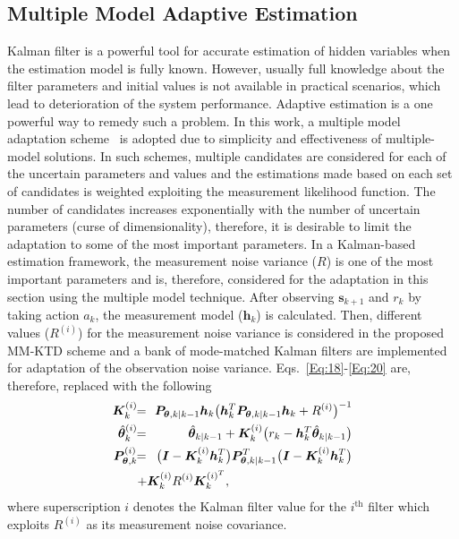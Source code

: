 \documentclass{ieeeaccess}
\def\k{_{k}}
\def\nk{_{k+1}}
\def\i{^{i}}
\def\bt{\bm{\theta}}
\def\h{\bm{h}}
\def\I{\bm{I}}
\def\K{\bm{K}}
\def\P{\bm{P}}
\def\s{\bm{s}}
\def\kpk{_{k|k-1}}
\def\i{^{(i)}}
\begin{document}
\subsection{Multiple Model Adaptive Estimation}
Kalman filter is a powerful tool for accurate estimation of hidden variables when the estimation model is fully known. However, usually full knowledge about the filter parameters and initial values is not available in practical scenarios, which lead to deterioration of the system performance. Adaptive estimation is a one powerful way to remedy such a problem. In this work, a multiple model adaptation scheme~\cite{AK1, AK2, AK3, AK4} is adopted due to simplicity and effectiveness of multiple-model solutions. In such schemes, multiple candidates are considered for each of the uncertain parameters and values and the estimations made based on each set of candidates is weighted exploiting the measurement likelihood function. The number of candidates increases exponentially with the number of uncertain parameters (curse of dimensionality), therefore, it is desirable to limit the adaptation to some of the most important parameters.
In a Kalman-based estimation framework, the measurement noise variance ($R$) is one of the most important parameters and is, therefore, considered for the adaptation in this section using the multiple model technique. After observing $\s\nk$ and $r\k$ by taking action $a\k$, the measurement model ($\h\k$) is calculated. Then, different values ($R\i$) for the measurement noise variance is considered in the proposed MM-KTD scheme and a bank of mode-matched Kalman filters are implemented for adaptation of the observation noise variance. 
Eqs.~\eqref{Eq:18}-\eqref{Eq:20} are, therefore, replaced with the following
%
\begin{eqnarray}
\K\i\k &\!\!=\!\!& \P_{\bt,k|k-1} \h\k\big(\h\k^T\P_{\bt, k|k-1}\h\k +R\i \big)^{-1}\label{Eq:21}\\
\hat{\bt}\i\k &\!\!=\!\!& \hat{\bt}\kpk + \K\i\k\big(r\k - \h\k^T \hat{\bt}\kpk\big)\\
\P\i_{\bt,k} &\!\!=\!\!& \big(\I - \K\i\k\h\k^T\big)\P^T_{\bt, k|k-1}\big(\I - \K\i\k\h\k^T\big) \nonumber\\ \lefteqn{+\K\i\k R\i\K^{(i)^T}\k,\label{Eq:23}}
\end{eqnarray}
%
where superscription $i$ denotes the Kalman filter value for the $i^{\text{th}}$ filter which exploits $R\i$ as its measurement noise covariance.
\end{document}
